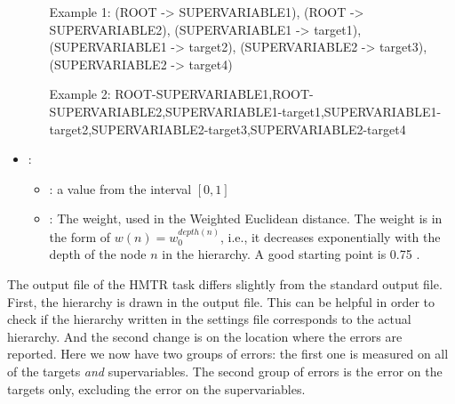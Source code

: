 \begin{itemize}
\begin{itemize}
  \subitem \begin{sloppypar}Example 1: (ROOT { }-\textgreater{ } SUPERVARIABLE1), (ROOT { }-\textgreater{ } SUPERVARIABLE2), (SUPERVARIABLE1 { }-\textgreater{ } target1), (SUPERVARIABLE1 { }-\textgreater{ } target2), (SUPERVARIABLE2 { }-\textgreater{ } target3), (SUPERVARIABLE2 { }-\textgreater{ } target4)\end{sloppypar}
	\subitem \begin{sloppypar}Example 2: ROOT-SUPERVARIABLE1,ROOT-SUPERVARIABLE2,SUPERVARIABLE1-target1,SUPERVARIABLE1-target2,SUPERVARIABLE2-target3,SUPERVARIABLE2-target4\end{sloppypar}
           \end{itemize}
    \item {}:
           \begin{itemize}
                \item \optionPossibleValues{}: a value from the interval $[0, 1]$
                \item \optionDescrption{}: The weight, used in the Weighted Euclidean distance. The weight is in the form of $w(n)=w_{0}^{depth(n)}$, i.e., it decreases exponentially with the depth of the node $n$ in the hierarchy. A good starting point is 0.75 \cite{Mileski2017:proc}.
           \end{itemize}
\end{itemize}

The output file of the HMTR task differs slightly from the standard output file. First, the hierarchy is drawn in the output file. This can be helpful in order to check if the hierarchy written in the settings file corresponds to the actual hierarchy. And the second change is on the location where the errors are reported. Here we now have two groups of errors: the first one is measured on all of the targets \textit{and} supervariables. The second group of errors is the error on the targets only, excluding the error on the supervariables.
